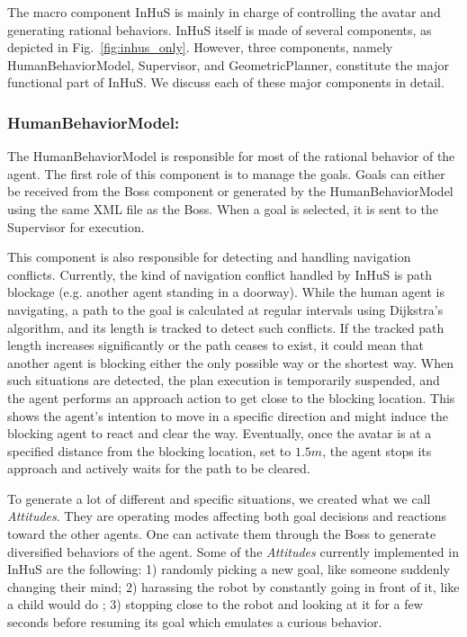 The macro component InHuS is mainly in charge of controlling the avatar and generating rational behaviors. InHuS itself is made of several components, as depicted in Fig.~\ref{fig:inhus_only}. However, three components, namely HumanBehaviorModel, Supervisor, and GeometricPlanner, constitute the major functional part of InHuS. We discuss each of these major components in detail.


\subsubsection{HumanBehaviorModel:}

The HumanBehaviorModel is responsible for most of the rational behavior of the agent. The first role of this component is to manage the goals. Goals can either be received from the Boss component or generated by the HumanBehaviorModel using the same XML file as the Boss. When a goal is selected, it is sent to the Supervisor for execution. 

This component is also responsible for detecting and handling navigation conflicts. Currently, the kind of navigation conflict handled by InHuS is path blockage (e.g. another agent standing in a doorway). While the human agent is navigating, a path to the goal is calculated at regular intervals using Dijkstra's algorithm, and its length is tracked to detect such conflicts. If the tracked path length increases significantly or the path ceases to exist, it could mean that another agent is blocking either the only possible way or the shortest way. When such situations are detected, the plan execution is temporarily suspended, and the agent performs an approach action to get close to the blocking location. This shows the agent's intention to move in a specific direction and might induce the blocking agent to react and clear the way.
Eventually, once the avatar is at a specified distance from the blocking location, set to $1.5m$, the agent stops its approach and actively waits for the path to be cleared.

To generate a lot of different and specific situations, we created what we call \textit{Attitudes}. They are operating modes affecting both goal decisions and reactions toward the other agents. One can activate them through the Boss to generate diversified behaviors of the agent. Some of the \textit{Attitudes} currently implemented in InHuS are the following: 1) randomly picking a new goal, like someone suddenly changing their mind; 2) harassing the robot by constantly going in front of it, like a child would do \cite{nomura2016children}; 3) stopping close to the robot and looking at it for a few seconds before resuming its goal which emulates a curious behavior. 


